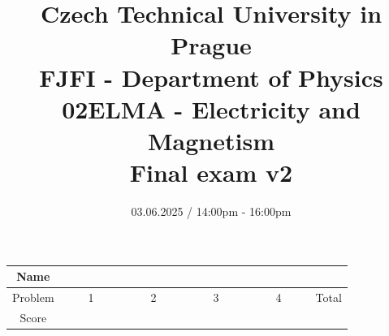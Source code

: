 \documentclass[a4paper,12pt]{article}
\title{{\large Czech Technical University in Prague} \\
    {\Large FJFI - Department of Physics} \\ 
                  02ELMA - Electricity and Magnetism \\ 
          {\Large \textbf{Final exam v2}}\vspace{-1cm}}
\date{03.06.2025 / 14:00pm - 16:00pm}
\author{}
\begin{document}
\maketitle
\vspace{-1.5em}

\begin{center}
    \renewcommand{\arraystretch}{2}
    \begin{tabular}{ |c|c|c|c|c|c| } 
        \hline
        Name& \multicolumn{5}{c|}{\phantom{~~~~~~~~~~~~~~~~~~~~~~~~~~~~~~~~~~~~~~~~~~~~~~~~~~~~~~~~~~~~~~~~~~~~~~~~~~~~~~~~~}}\\
        \hline
        Problem & ~~~~1~~~~ & ~~~~2~~~~ & ~~~~3~~~~ & ~~~~4~~~~ & Total \\ 
        \hline
        Score & &  & & & \\
        \hline
    \end{tabular}
\end{center}

\vspace*{1cm}







\end{document}
